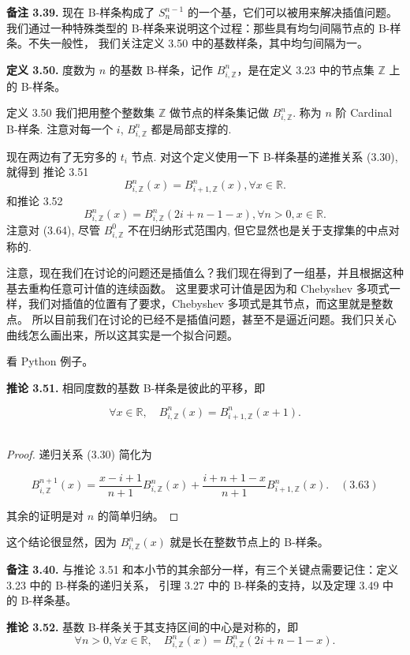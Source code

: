 \documentclass[a4paper]{ctexart}
\begin{document}
{\noindent \textbf{备注 3.39.} 现在 B-样条构成了 $S_{n}^{n-1}$ 的一个基，它们可以被用来解决插值问题。
我们通过一种特殊类型的 B-样条来说明这个过程：那些具有均匀间隔节点的 B-样条。不失一般性，
我们关注定义 3.50 中的基数样条，其中均匀间隔为一。

\noindent \textbf{定义 3.50.} 度数为 $n$ 的基数 B-样条，记作 $B_{i,\mathbb{Z}}^{n}$，是在定义 3.23 中的节点集 $\mathbb{Z}$ 上的 B-样条。


定义 3.50 我们把用整个整数集 $\mathbb{Z}$ 做节点的样条集记做 $B_{i,
  \mathbb{Z}}^n$. 称为 $n$ 阶 Cardinal B-样条. 注意对每一个 $i$, $B_{i,
  \mathbb{Z}}^n$ 都是局部支撑的.

现在两边有了无穷多的 $t_i$ 节点. 对这个定义使用一下 B-样条基的递推关系 (3.30), 就得到
推论 3.51
$$
B_{i, \mathbb{Z}}^n(x) = B_{i + 1, \mathbb{Z}}^n(x), \forall x \in \mathbb{R}.
$$
和推论 3.52
$$
B_{i, \mathbb{Z}}^n(x) = B_{i, \mathbb{Z}}^n(2i + n - 1 - x), \forall n > 0, x \in \mathbb{R}.
$$
注意对 (3.64), 尽管 $B_{i, \mathbb{Z}}^0$ 不在归纳形式范围内, 但它显然也是关于支撑集的中点对称的.

注意，现在我们在讨论的问题还是插值么？我们现在得到了一组基，并且根据这种基去重构任意可计值的连续函数。
这里要求可计值是因为和 Chebyshev 多项式一样，我们对插值的位置有了要求，Chebyshev 多项式是其节点，而这里就是整数点。
所以目前我们在讨论的已经不是插值问题，甚至不是逼近问题。我们只关心曲线怎么画出来，所以这其实是一个拟合问题。

看 Python 例子。

\noindent \textbf{推论 3.51.} 相同度数的基数 B-样条是彼此的平移，即

\[\forall x \in \mathbb{R}, \quad B_{i,\mathbb{Z}}^n(x) = B_{i+1,\mathbb{Z}}^n(x + 1). \tag{3.62}\]
\
\begin{proof}
递归关系 (3.30) 简化为

$$B_{i,\mathbb{Z}}^{n+1}(x) = \frac{x - i + 1}{n + 1} B_{i,\mathbb{Z}}^n(x) + \frac{i + n + 1 - x}{n + 1} B_{i+1,\mathbb{Z}}^n(x). \quad (3.63)$$

其余的证明是对 $n$ 的简单归纳。
\end{proof} 

这个结论很显然，因为 $B_{i,\mathbb{Z}}^n(x)$ 就是长在整数节点上的 B-样条。

\noindent \textbf{备注 3.40.} 与推论 3.51 和本小节的其余部分一样，有三个关键点需要记住：定义 3.23 中的 B-样条的递归关系，
引理 3.27 中的 B-样条的支持，以及定理 3.49 中的 B-样条基。

\noindent \textbf{推论 3.52.} 基数 B-样条关于其支持区间的中心是对称的，即
\[
\forall n>0, \forall x \in \mathbb{R}, \quad B_{i,\mathbb{Z}}^n(x) = B_{i,\mathbb{Z}}^n(2i+n-1-x). \tag{3.64}
\]

}
\end{document}
